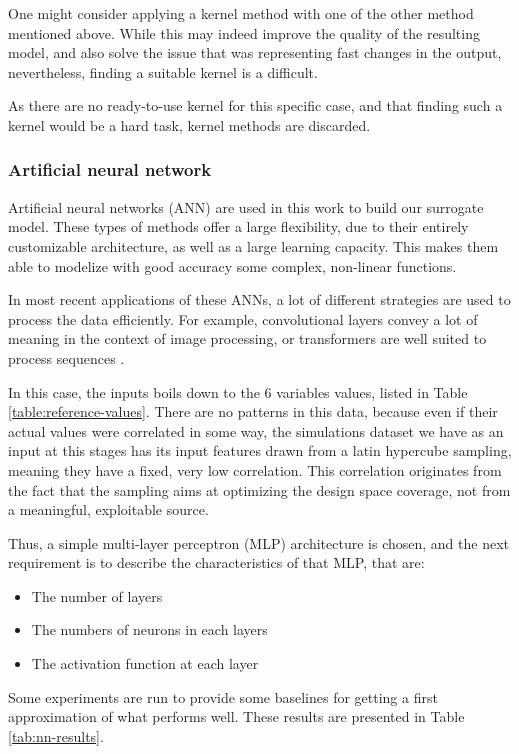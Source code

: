 One might consider applying a kernel method with one of the other method mentioned above. While this may indeed improve the quality of the resulting model, and also solve the issue that was representing fast changes in the output, nevertheless, finding a suitable kernel is a difficult.

As there are no ready-to-use kernel for this specific case, and that finding such a kernel would be a hard task, kernel methods are discarded.

\subsubsection{Artificial neural network}

Artificial neural networks (ANN) are used in this work to build our surrogate model. These types of methods offer a large flexibility, due to their entirely customizable architecture, as well as a large learning capacity. This makes them able to modelize with good accuracy some complex, non-linear functions.

In most recent applications of these ANNs, a lot of different strategies are used to process the data efficiently. For example, convolutional layers convey a lot of meaning in the context of image processing, or transformers are well suited to process sequences \cite{deep-learning-class}.

In this case, the inputs boils down to the 6 variables values, listed in Table \ref{table:reference-values}. There are no patterns in this data, because even if their actual values were correlated in some way, the simulations dataset we have as an input at this stages has its input features drawn from a latin hypercube sampling, meaning they have a fixed, very low correlation. This correlation originates from the fact that the sampling aims at optimizing the design space coverage, not from a meaningful, exploitable source.

Thus, a simple multi-layer perceptron (MLP) architecture is chosen, and the next requirement is to describe the characteristics of that MLP, that are:
\begin{itemize}
    \item The number of layers
    \item The numbers of neurons in each layers
    \item The activation function at each layer
\end{itemize}

Some experiments are run to provide some baselines for getting a first approximation of what performs well. These results are presented in Table \ref{tab:nn-results}.

